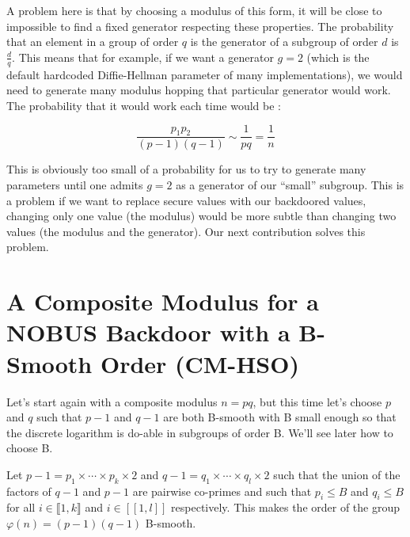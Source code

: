 \documentclass[a4paper,11pt,twocolumn]{article}
\begin{document}
A problem here is that by choosing a modulus of this form, it will be close to impossible to find a fixed generator respecting these properties. The probability that an element in a group of order $q$ is the generator of a subgroup of order $d$ is $\frac{d}{q}$. This means that for example, if we want a generator $g=2$ (which is the default hardcoded Diffie-Hellman parameter of many implementations), we would need to generate many modulus hopping that particular generator would work. The probability that it would work each time would be :

$$\frac{p_1 p_2}{(p-1)(q-1)} \sim \frac{1}{pq} = \frac{1}{n} $$

This is obviously too small of a probability for us to try to generate many parameters until one admits $g=2$ as a generator of our ``small'' subgroup. This is a problem if we want to replace secure values with our backdoored values, changing only one value (the modulus) would be more subtle than changing two values (the modulus and the generator). Our next contribution solves this problem.


\section{A Composite Modulus for a NOBUS Backdoor with a B-Smooth Order (CM-HSO)}

Let's start again with a composite modulus $n= pq$, but this time let's choose $p$ and $q$ such that $p-1$ and $q-1$ are both B-smooth with B small enough so that the discrete logarithm is do-able in subgroups of order B. We'll see later how to choose B.

Let $p-1 = p_1 \times \cdots \times p_k \times 2$ and $q-1 = q_1 \times \cdots \times q_l \times 2$ such that the union of the factors of $q-1$ and $p-1$ are pairwise co-primes and such that $p_i \leq B$ and $q_i \leq B$ for all $i \in \llbracket 1,k \rrbracket$ and $i \in [[1,l]]$ respectively. This makes the order of the group $\varphi(n) = (p-1)(q-1)$ B-smooth.
\end{document}
